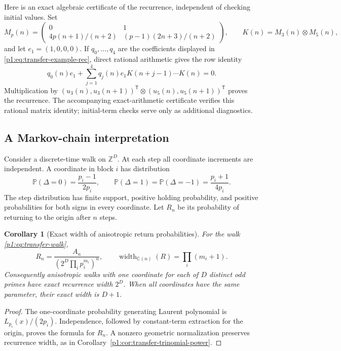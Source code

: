 \documentclass[11pt,a4paper]{article}
\newtheorem{corollary}[theorem]{Corollary}
\theoremstyle{definition}
\theoremstyle{remark}
\numberwithin{equation}{section}
\begin{document}
Here is an exact algebraic certificate of the recurrence, independent of
checking initial values.  Set
\[
 M_p(n)=\begin{pmatrix}
 0&1\\[1mm]
 4p(n+1)/(n+2)&(p-1)(2n+3)/(n+2)
 \end{pmatrix},\qquad K(n)=M_3(n)\otimes M_5(n),
\]
and let $e_1=(1,0,0,0)$.  If $q_0,\ldots,q_4$ are the coefficients
displayed in \eqref{p1:eq:transfer-example-rec}, direct rational arithmetic
gives the row identity
\[
 q_0(n)e_1+
 \sum_{j=1}^4q_j(n)e_1K(n+j-1)\cdots K(n)=0.
\]
Multiplication by
$(u_3(n),u_3(n+1))^{\mathsf T}\otimes
 (u_5(n),u_5(n+1))^{\mathsf T}$ proves the recurrence.
The accompanying exact-arithmetic certificate verifies this rational
matrix identity; initial-term checks serve only as additional diagnostics.

\subsection{A Markov-chain interpretation}

Consider a discrete-time walk on $\mathbb Z^D$.  At each step all coordinate
increments are independent.  A coordinate in block $i$ has distribution
\begin{equation}\label{p1:eq:transfer-walk}
 \mathbb P(\Delta=0)=\frac{p_i-1}{2p_i},\qquad
 \mathbb P(\Delta=1)=\mathbb P(\Delta=-1)=\frac{p_i+1}{4p_i}.
\end{equation}
The step distribution has finite support, positive holding probability,
and positive probabilities for both signs in every coordinate.  Let
$R_n$ be its probability of returning to the origin after $n$ steps.

\begin{corollary}[Exact width of anisotropic return probabilities]
\label{p1:cor:transfer-walk}
For the walk \eqref{p1:eq:transfer-walk},
\[
 R_n=\frac{A_n}{(2^D\prod_i p_i^{m_i})^n},\qquad
 \operatorname{width}_{\mathbb C(n)}(R)=\prod_i(m_i+1).
\]
Consequently anisotropic walks with one coordinate for each of $D$
distinct odd primes have exact recurrence width $2^D$.  When all coordinates
have the same parameter, their exact width is $D+1$.
\end{corollary}

\begin{proof}
The one-coordinate probability generating Laurent polynomial is
$L_{p_i}(x)/(2p_i)$.  Independence, followed by constant-term extraction
for the origin, proves the formula for $R_n$.  A nonzero geometric
normalization preserves recurrence width, as in
Corollary~\ref{p1:cor:transfer-trinomial-power}.
\end{proof}
\end{document}
